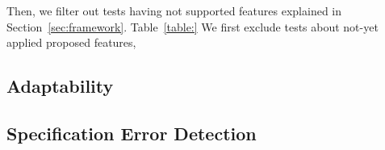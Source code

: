 Then, we filter out tests having not supported features explained in Section~\ref{sec:framework}.
Table~\ref{table:}
We first exclude tests about not-yet applied proposed features, 

\subsection{Adaptability}
\subsection{Specification Error Detection}


